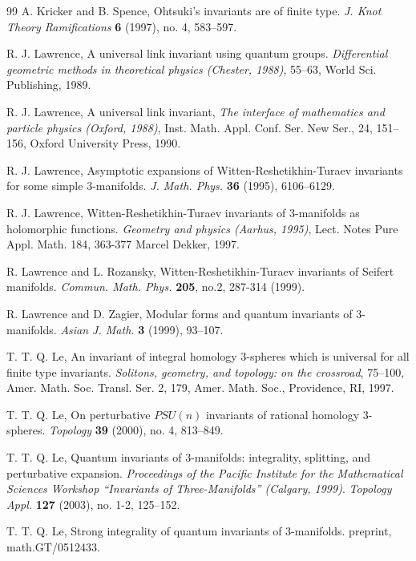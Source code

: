 \documentclass{amsart}
\numberwithin{equation}{section}
\numberwithin{figure}{section}
\theoremstyle{plain}
\theoremstyle{definition}
\theoremstyle{remark}
\begin{document}
\begin{thebibliography}{99}
A. Kricker and B. Spence,
Ohtsuki's invariants are of finite type.
{\it J. Knot Theory Ramifications} {\bf 6} (1997), no. 4, 583--597.

R. J. Lawrence,
A universal link invariant using quantum groups.
{\it Differential geometric methods in theoretical physics (Chester, 1988)}, 55--63, World Sci. Publishing, 1989.

R. J. Lawrence,
A universal link invariant,
{\it The interface of mathematics and particle physics (Oxford,
  1988)}, Inst. Math. Appl. Conf. Ser. New Ser., 24, 151--156, Oxford
University Press, 1990.

R. J. Lawrence,
Asymptotic expansions of Witten-Reshetikhin-Turaev invariants for some simple $3$-manifolds.
{\it J. Math. Phys.} {\bf 36} (1995), 6106--6129.

R. J. Lawrence,
Witten-Reshetikhin-Turaev invariants of $3$-manifolds as holomorphic functions.
{\it Geometry and
physics (Aarhus, 1995)},  Lect. Notes Pure
Appl. Math. 184, 363-377 Marcel Dekker, 1997.

R. Lawrence and L. Rozansky,
Witten-Reshetikhin-Turaev invariants of Seifert manifolds.
{\it Commun. Math. Phys.} {\bf 205}, no.2, 287-314 (1999).

R. Lawrence and D. Zagier,
Modular forms and quantum invariants of $3$-manifolds.
{\it Asian J. Math.} {\bf 3} (1999), 93--107.

T. T. Q. Le,
An invariant of integral homology $3$-spheres which is universal for all finite type invariants.
{\it Solitons, geometry, and topology: on the crossroad}, 75--100,
Amer. Math. Soc. Transl. Ser. 2, 179, Amer. Math. Soc., Providence,
RI, 1997.

T. T. Q. Le,
On perturbative $PSU(n)$ invariants of rational homology 3-spheres.
{\it Topology} {\bf 39} (2000), no. 4, 813--849.

T. T. Q. Le,
Quantum invariants of 3-manifolds: integrality, splitting, and perturbative expansion.
{\it Proceedings of the Pacific Institute for the Mathematical
Sciences Workshop ``Invariants of Three-Manifolds'' (Calgary, 1999)}.
{\it Topology Appl.}  {\bf 127} (2003), no. 1-2, 125--152.

T. T. Q. Le,
Strong integrality of quantum invariants of $3$-manifolds.
preprint, math.GT/0512433.


\end{thebibliography}
\end{document}
